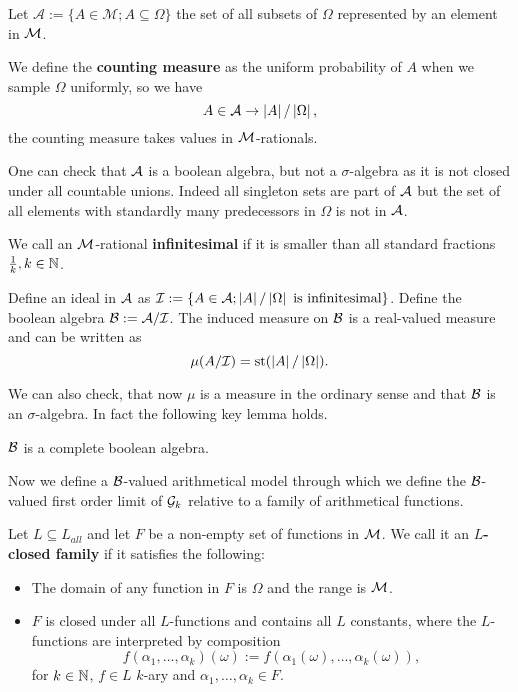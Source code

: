 \begin{defi}
Let $\mathcal{A}:=\{A\in\mathcal{M};A\subseteq \Omega\}$ the set of all subsets of $\Omega$ represented by an element in $\mathcal{M}$.

We define the \textbf{counting measure} as the uniform probability of $A$ when we sample $\Omega$ uniformly, so we have
\[A\in\mathcal{A} \to \left|{A}\right|/\left|{\Omega}\right|,\]
the counting measure takes values in $\mathcal{M}$-rationals.
\end{defi}

One can check that $\mathcal{A}$ is a boolean algebra, but not a $\sigma$-algebra as it is not closed under all countable unions. Indeed all singleton sets are part of $\mathcal{A}$ but the set of all elements with standardly many predecessors in $\Omega$ is not in $\mathcal{A}$.

\begin{defi}
We call an $\mathcal{M}$-rational \textbf{infinitesimal} if it is smaller than all standard fractions $\frac{1}{k},k\in\mathbb{N}$.

Define an ideal in $\mathcal{A}$ as $\mathcal{I}:=\{A\in\mathcal{A};\left|{A}\right|/\left|{\Omega}\right|\text{ is infinitesimal}\}$. Define the boolean algebra $\mathcal{B}:=\mathcal{A}/\mathcal{I}$. The induced measure on $\mathcal{B}$ is a real-valued measure and can be written as \[\mu(A/\mathcal{I})=\text{st}(\left|{A}\right|/\left|{\Omega}\right|).\]
\end{defi}

We can also check, that now $\mu$ is a measure in the ordinary sense and that $\mathcal{B}$ is an $\sigma$-algebra. In fact the following key lemma holds.

\begin{lemm}
$\mathcal{B}$ is a complete boolean algebra.
\end{lemm}

Now we define a $\mathcal{B}$-valued arithmetical model through which we define the $\mathcal{B}$-valued first order limit of $\mathcal{G}_k$ relative to a family of arithmetical functions. 

\begin{defi}
Let $L\subseteq L_{all}$ and let $F$ be a non-empty set of functions in $\mathcal{M}$. We call it an \textbf{$L$-closed family} if it satisfies the following:
\begin{itemize}
\item The domain of any function in $F$ is $\Omega$ and the range is $\mathcal{M}$.
\item $F$ is closed under all $L$-functions and contains all $L$ constants, where the $L$-functions are interpreted by composition
\[f(\alpha_1,\dots,\alpha_k)(\omega):=f(\alpha_1(\omega),\dots,\alpha_k(\omega)),\]
for $k\in\mathbb{N}$, $f\in L$ $k$-ary and $\alpha_1,\dots,\alpha_k\in F$.
\end{itemize}
\end{defi}

